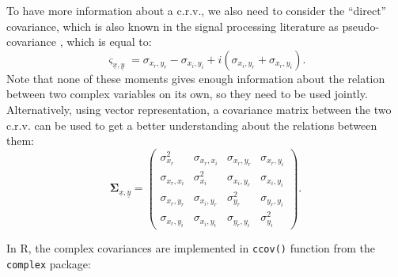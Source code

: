 \documentclass[
]{book}
\begin{document}
To have more information about a c.r.v., we also need to consider the ``direct'' covariance, which is also known in the signal processing literature as pseudo-covariance \citep[\citet{Gao2019}]{Neeser1993}, which is equal to:
\begin{equation}
    \varsigma_{\underline{x},\underline{y}} = \sigma_{x_r, y_r} - \sigma_{x_i, y_i} + i (\sigma_{x_i, y_r} + \sigma_{x_r, y_i}).
    \label{eq:crvMomentSecondPseudoCovarianceShort}
\end{equation}
Note that none of these moments gives enough information about the relation between two complex variables on its own, so they need to be used jointly. Alternatively, using vector representation, a covariance matrix between the two c.r.v. can be used to get a better understanding about the relations between them:
\begin{equation}
    \boldsymbol{\Sigma}_{\underline{x},\underline{y}} =
        \begin{pmatrix}
            \sigma_{x_r}^2 & \sigma_{x_r, x_i} & \sigma_{x_r, y_r} & \sigma_{x_r, y_i} \\
            \sigma_{x_r, x_i} & \sigma_{x_i}^2 & \sigma_{x_i, y_r} & \sigma_{x_i, y_i} \\
            \sigma_{x_r, y_r} & \sigma_{x_i, y_r} & \sigma_{y_r}^2 & \sigma_{y_r, y_i} \\
            \sigma_{x_r, y_i} & \sigma_{x_i, y_i} & \sigma_{y_r, y_i} & \sigma_{y_i}^2
        \end{pmatrix} .
    \label{eq:crvMomentSecondCoVarianceMatrix}
\end{equation}

In R, the complex covariances are implemented in \texttt{ccov()} function from the \texttt{complex} package:
\end{document}
